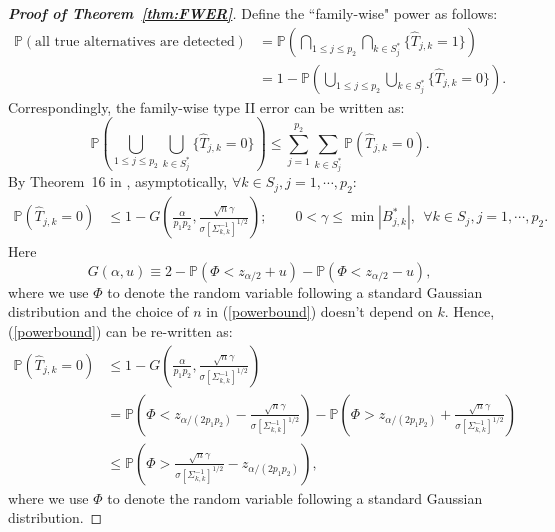 \begin{proof}[\textbf{Proof of Theorem~\ref{thm:FWER}}]
	Define the ``family-wise" power as follows: 
	\begin{equation*}
	\begin{split}
	\mathbb{P}\left( \text{all true alternatives are detected} \right) & = \mathbb{P}\left( \bigcap\limits_{1\leq j\leq p_2}\bigcap\limits_{k\in S^*_j}\{\widehat{T}_{j,k}=1\}\right) \\
	& = 1 - \mathbb{P}\left( \bigcup\limits_{1\leq j\leq p_2}\bigcup\limits_{k\in S^*_j}\{\widehat{T}_{j,k}=0\}\right).
	\end{split}
	\end{equation*}
	Correspondingly, the family-wise type II error can be  written as:
	\begin{equation}\label{type2}
	\mathbb{P}\left( \bigcup\limits_{1\leq j\leq p_2}\bigcup\limits_{k\in S^*_j}\{\widehat{T}_{j,k}=0\}\right) \leq \sum_{j=1}^{p_2}\sum_{k\in S^*_j} \mathbb{P}\left( \widehat{T}_{j,k}=0\right). 
	\end{equation}
	By Theorem~16 in \citet{javanmard2014confidence}, asymptotically, $\forall k\in S_j,j=1,\cdots,p_2$:
	\begin{equation}\label{powerbound}
	\begin{split}
	\mathbb{P}\left(\widehat{T}_{j,k}=0\right) & \leq 1 - G\left(\frac{\alpha}{p_1p_2},\frac{\sqrt{n}\gamma}{\sigma[\Sigma^{-1}_{k,k}]^{1/2}}\right); \qquad 0<\gamma\leq \min|B^*_{j,k}|,~~\forall k\in S_j,j=1,\cdots,p_2.
	\end{split}
	\end{equation}
	Here 
	\begin{equation*}
	G(\alpha,u) \equiv  2- \mathbb{P}(\Phi < z_{\alpha/2}+u) - \mathbb{P}(\Phi < z_{\alpha/2} - u),
	\end{equation*}
	where we use $\Phi$ to denote the random variable following a standard Gaussian distribution and the choice of $n$ in (\ref{powerbound}) doesn't depend on $k$. Hence, (\ref{powerbound}) can be re-written as:
	\begin{equation}\label{type2:ind}
	\begin{split}
	\mathbb{P}\left(\widehat{T}_{j,k}=0\right) & \leq 1 - G\left(\frac{\alpha}{p_1p_2},\frac{\sqrt{n}\gamma}{\sigma[\Sigma^{-1}_{k,k}]^{1/2}}\right)  \\
	& =   \mathbb{P}\left( \Phi < z_{\alpha/(2p_1p_2)} - \frac{\sqrt{n}\gamma}{\sigma[\Sigma^{-1}_{k,k}]^{1/2}}\right) - \mathbb{P}\left( \Phi > z_{\alpha/(2p_1p_2)} + \frac{\sqrt{n}\gamma}{\sigma[\Sigma^{-1}_{k,k}]^{1/2}}\right) \\
	& \leq  \mathbb{P}\left( \Phi >  \frac{\sqrt{n}\gamma}{\sigma[\Sigma^{-1}_{k,k}]^{1/2}}-z_{\alpha/(2p_1p_2)} \right),
	\end{split}
	\end{equation}
	where we use $\Phi$ to denote the random variable following a standard Gaussian distribution.
	

\end{proof}
